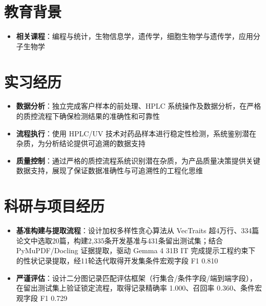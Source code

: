 \documentclass{my-resume}
\begin{document}


\section{教育背景}
\begin{itemize}[parsep=0.2ex]
  \item \textbf{相关课程}：编程与统计，生物信息学，遗传学，细胞生物学与遗传学，应用分子生物学
\end{itemize}

\section{实习经历}
\begin{itemize}[parsep=0.2ex]
  \item \textbf{数据分析}：独立完成客户样本的前处理、HPLC 系统操作及数据分析，在严格的质控流程下确保检测结果的准确性和可靠性
  \item \textbf{流程执行}：使用 HPLC/UV 技术对药品样本进行稳定性检测，系统鉴别潜在杂质，为分析结论提供可追溯的数据支持
  \item \textbf{质量控制}：通过严格的质控流程系统识别潜在杂质，为产品质量决策提供关键数据支持，展现了保证数据准确性与可追溯性的工程化思维
\end{itemize}

\section{科研与项目经历}

\begin{itemize}[parsep=0.2ex]
  \item \textbf{基准构建与提取流程}：设计加权多样性贪心算法从 VecTraits 超4万行、334篇论文中选取20篇，构建2,335条开发基准与431条留出测试集；结合 PyMuPDF/Docling 证据提取，驱动 Gemma 4 31B IT 完成提示工程约束下的性状记录提取，经11轮迭代取得开发集条件宏观字段 F1 0.810
  \item \textbf{严谨评估}：设计二分图记录匹配评估框架（行集合/条件字段/端到端字段），在留出测试集上验证锁定流程，取得记录精确率 1.000、召回率 0.360、条件宏观字段 F1 0.729
\end{itemize}
\end{document}

